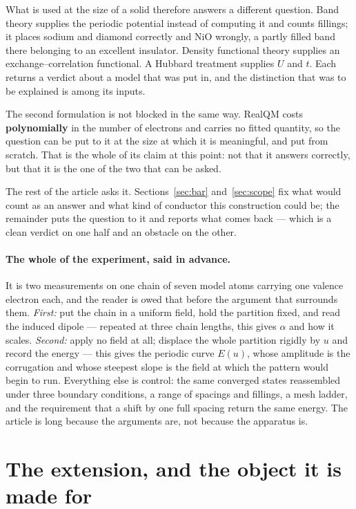 \documentclass[11pt]{article}
\begin{document}
What is used at the size of a solid therefore answers a different question. Band theory supplies the
periodic potential instead of computing it and counts fillings; it places sodium and diamond
correctly and NiO wrongly, a partly filled band there belonging to an excellent insulator. Density
functional theory supplies an exchange--correlation functional. A Hubbard treatment supplies $U$ and
$t$. Each returns a verdict about a model that was put in, and the distinction that was to be
explained is among its inputs.

The second formulation is not blocked in the same way. RealQM costs \textbf{polynomially} in the
number of electrons and carries no fitted quantity, so the question can be put to it at the size at
which it is meaningful, and put from scratch. That is the whole of its claim at this point: not that
it answers correctly, but that it is the one of the two that can be asked.

The rest of the article asks it. Sections~\ref{sec:bar} and~\ref{sec:scope} fix what would count as
an answer and what kind of conductor this construction could be; the remainder puts the question to
it and reports what comes back --- which is a clean verdict on one half and an obstacle on the
other.

\paragraph{The whole of the experiment, said in advance.} It is two measurements on one chain of
seven model atoms carrying one valence electron each, and the reader is owed that before the
argument that surrounds them. \emph{First:} put the chain in a uniform field, hold the partition
fixed, and read the induced dipole --- repeated at three chain lengths, this gives $\alpha$ and how
it scales. \emph{Second:} apply no field at all; displace the whole partition rigidly by $u$ and
record the energy --- this gives the periodic curve $E(u)$, whose amplitude is the corrugation and
whose steepest slope is the field at which the pattern would begin to run. Everything else is
control: the same converged states reassembled under three boundary conditions, a range of spacings
and fillings, a mesh ladder, and the requirement that a shift by one full spacing return the same
energy. The article is long because the arguments are, not because the apparatus is.

\section{The extension, and the object it is made for}
\end{document}
